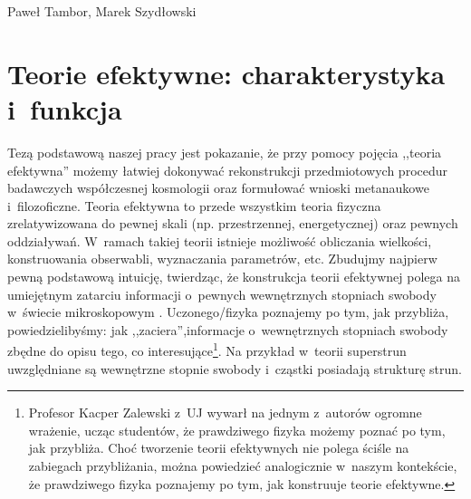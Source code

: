 \begin{artplenv}{Paweł Tambor, Marek Szydłowski}
\section{Teorie efektywne: charakterystyka i~funkcja}
Tezą podstawową naszej pracy jest pokazanie, że przy pomocy pojęcia ,,teoria efektywna'' możemy łatwiej dokonywać rekonstrukcji przedmiotowych procedur badawczych współczesnej kosmologii oraz formułować wnioski metanaukowe i~filozoficzne. Teoria efektywna to przede wszystkim teoria fizyczna zrelatywizowana do pewnej skali (np. przestrzennej, energetycznej) oraz pewnych oddziaływań. W~ramach takiej teorii istnieje możliwość obliczania wielkości, konstruowania obserwabli, wyznaczania parametrów, etc. Zbudujmy najpierw pewną podstawową intuicję, twierdząc, że konstrukcja teorii efektywnej polega na umiejętnym zatarciu informacji o~pewnych wewnętrznych stopniach swobody w~świecie mikroskopowym 
\parencites{morrison_modelling_1998}{morrison_approximating_2005}.
Uczonego/fizyka poznajemy po tym, jak przybliża, powiedzielibyśmy: jak ,,zaciera'',informacje o~wewnętrznych stopniach swobody zbędne do opisu tego, co interesujące\footnote{Profesor Kacper Zalewski z~UJ wywarł na jednym z~autorów ogromne wrażenie, ucząc studentów, że prawdziwego fizyka możemy poznać po tym, jak przybliża. Choć tworzenie teorii efektywnych nie polega ściśle na zabiegach przybliżania, można powiedzieć analogicznie w~naszym kontekście, że prawdziwego fizyka poznajemy po tym, jak konstruuje teorie efektywne.}. Na przykład w~teorii superstrun uwzględniane są wewnętrzne stopnie swobody i~cząstki posiadają strukturę strun.


\end{artplenv}
